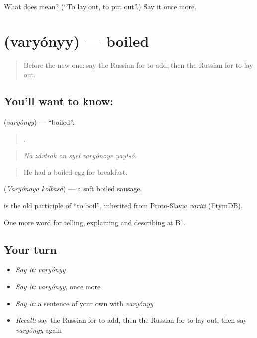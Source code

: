\begin{tcolorbox}[breakable,colback=teal!4,colframe=teal!35!black,title={Before you move on}]
What does  mean? (\textquotedblleft{}To lay out, to put out\textquotedblright{}.) Say it once more.
\end{tcolorbox}
\section[\texorpdfstring{\ru{варёный} (varyónyy)}{варёный (varyónyy)}]{ (varyónyy) — boiled}

\label{lesson:RU-C336-varyonyy}



\begin{quote}
Before the new one: say the Russian for to add, then the Russian for to lay out.
\end{quote}

\subsection*{You'll want to know: }
\textbf{} (\emph{varyónyy}) — \textquotedblleft{}boiled\textquotedblright{}.

\begin{quote}
     .
\end{quote}

\begin{quote}
\emph{Na závtrak on syel varyónoye yaytsó.}
\end{quote}

\begin{quote}
He had a boiled egg for breakfast.
\end{quote}

\emph{ } (\emph{Varyónaya kolbasá}) — a soft boiled sausage.

\begin{cousinweb}
\emph{} is the old participle of \emph{} \textquotedblleft{}to boil\textquotedblright{}, inherited from Proto-Slavic \emph{variti} (EtymDB).
\end{cousinweb}

\begin{grammarlens}[title={What you've built}]
One more word for telling, explaining and describing at B1.
\end{grammarlens}

\subsection*{Your turn}
\begin{itemize}
\raggedright
  \item \emph{Say it:} \emph{varyónyy}
  \item \emph{Say it:} \emph{varyónyy}, once more
  \item \emph{Say it:} a sentence of your own with \emph{varyónyy}
  \item \emph{Recall:} say the Russian for to add, then the Russian for to lay out, then say \emph{varyónyy} again
\end{itemize}

